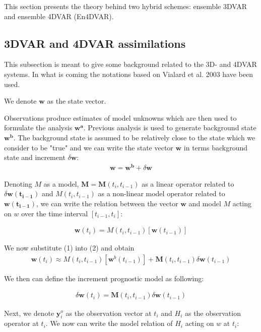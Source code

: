 \documentclass[a4,12pt]{article}
\numberwithin{equation}{section}
\begin{document}
This section presents the theory behind two hybrid schemes: ensemble 3DVAR and ensemble 4DVAR (En4DVAR). 

\subsection{3DVAR and 4DVAR assimilations}
This subsection is meant to give some background related to the 3D- and 4DVAR systems. In what is coming the notations based on Vialard et al. 2003 \cite{general} have been used.

We denote $\mathbf{w}$ as the state vector. 

Observations produce estimates of model unknowns which are then used to formulate the analysis $\mathbf{w^{a}}$. Previous analysis is used to generate background state $\mathbf{w^b}$. The background state is assumed to be relatively close to the state which we consider to be "true" and we can write the state vector $\mathbf {w}$ in terms background state and increment $\delta \mathbf {w}$:
\begin{align}
\mathbf{w} = \mathbf {w^{b}}+\delta \mathbf {w}
\end{align} 

Denoting $M$ as a model, $\mathbf {M} = \mathbf {M}(t_{i}, t_{i-1})$ as a linear operator related to $\delta \mathbf {w(t_{i-1})}$ and $M(t_{i},t_{i-1})$ as a non-linear model operator related to $\mathbf {w(t_{i-1})}$, we can write the relation between the vector $\mathbf {w}$ and model $M$ acting on $w$ over the time interval $[t_{i-1},t_{i}]$:

\begin{align}
\mathbf {w}(t_{i})=M(t_{i},t_{i-1})[\mathbf {w}(t_{i-1})]
\end{align}

We now substitute (1) into (2) and obtain 
\begin{align}
\mathbf {w}(t_{i}) \approx M(t_{i},t_{i-1})[\mathbf {w}^{b}(t_{i-1})] + \mathbf {M}(t_{i},t_{i-1})\delta \mathbf {w}(t_{i-1})
\end{align}

We then can define the increment prognostic model as following:

\begin{align}
\delta \mathbf {w}(t_{i}) = \mathbf {M}(t_{i},t_{i-1})\delta \mathbf {w}(t_{i-1})
\end{align}

Next, we denote $\mathbf {y}_{i}^{o}$ as the observation vector at $t_{i}$ and $H_{i}$ as the observation operator at $t_{i}$. We now can write the model relation of $H_{i}$ acting on $w$ at $t_{i}$:
\end{document}
